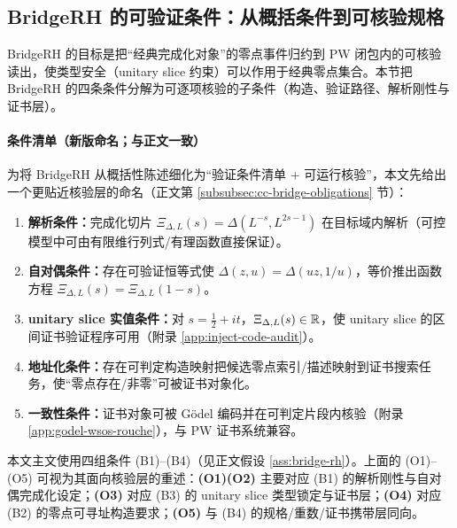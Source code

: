 \subsection{BridgeRH 的可验证条件：从概括条件到可核验规格}\label{subsec:bridge-rh-obligations}
BridgeRH 的目标是把“经典完成化对象”的零点事件归约到 PW 闭包内的可核验读出，使类型安全（unitary slice 约束）可以作用于经典零点集合。本节把 BridgeRH 的四条条件分解为可逐项核验的子条件（构造、验证路径、解析刚性与证书层）。

\paragraph{条件清单（新版命名；与正文一致）}
为将 BridgeRH 从概括性陈述细化为“验证条件清单 $+$ 可运行核验”，本文先给出一个更贴近核验层的命名（正文第 \ref{subsubsec:cc-bridge-obligations} 节）：
\begin{enumerate}
  \item[(O1)] \textbf{解析条件：}完成化切片 $\Xi_{\Delta,L}(s)=\Delta(L^{-s},L^{2s-1})$ 在目标域内解析（可控模型中可由有限维行列式/有理函数直接保证）。
  \item[(O2)] \textbf{自对偶条件：}存在可验证恒等式使 $\Delta(z,u)=\Delta(uz,1/u)$，等价推出函数方程 $\Xi_{\Delta,L}(s)=\Xi_{\Delta,L}(1-s)$。
  \item[(O3)] \textbf{unitary slice 实值条件：}对 $s=\frac12+it$，$\Xi_{\Delta,L}(s)\in\mathbb{R}$，使 unitary slice 的区间证书验证程序可用（附录 \ref{app:inject-code-audit}）。
  \item[(O4)] \textbf{地址化条件：}存在可判定构造映射把候选零点索引/描述映射到证书搜索任务，使“零点存在/非零”可被证书对象化。
  \item[(O5)] \textbf{一致性条件：}证书对象可被 Gödel 编码并在可判定片段内核验（附录 \ref{app:godel-wsos-rouche}），与 PW 证书系统兼容。
\end{enumerate}

\begin{remark}
本文主文使用四组条件 (B1)--(B4)（见正文假设 \ref{ass:bridge-rh}）。上面的 (O1)--(O5) 可视为其面向核验层的重述：\textbf{(O1)(O2)} 主要对应 (B1) 的解析刚性与自对偶完成化设定；\textbf{(O3)} 对应 (B3) 的 unitary slice 类型锁定与证书层；\textbf{(O4)} 对应 (B2) 的零点可寻址构造要求；\textbf{(O5)} 与 (B4) 的规格/重数/证书携带层同向。
\end{remark}

